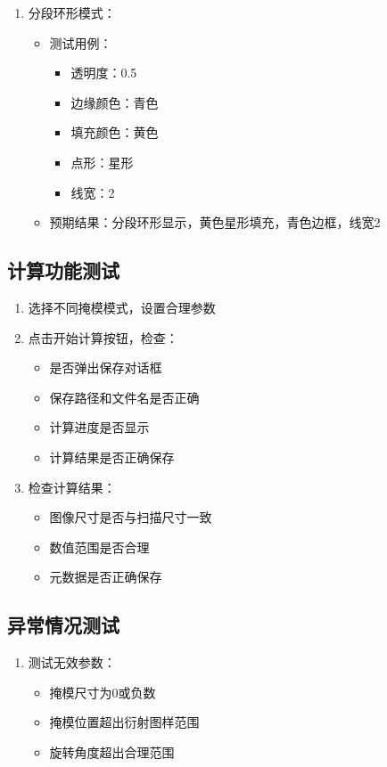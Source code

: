 \documentclass[a4paper,12pt]{report}	%
\begin{document}
\begin{enumerate}
    \item 分段环形模式：
    \begin{itemize}
        \item 测试用例：
        \begin{itemize}
            \item 透明度：0.5
            \item 边缘颜色：青色
            \item 填充颜色：黄色
            \item 点形：星形
            \item 线宽：2
        \end{itemize}
        \item 预期结果：分段环形显示，黄色星形填充，青色边框，线宽2
    \end{itemize}
\end{enumerate}

\subsection{计算功能测试}
\begin{enumerate}
    \item 选择不同掩模模式，设置合理参数
    \item 点击开始计算按钮，检查：
    \begin{itemize}
        \item 是否弹出保存对话框
        \item 保存路径和文件名是否正确
        \item 计算进度是否显示
        \item 计算结果是否正确保存
    \end{itemize}
    \item 检查计算结果：
    \begin{itemize}
        \item 图像尺寸是否与扫描尺寸一致
        \item 数值范围是否合理
        \item 元数据是否正确保存
    \end{itemize}
\end{enumerate}

\subsection{异常情况测试}
\begin{enumerate}
    \item 测试无效参数：
    \begin{itemize}
        \item 掩模尺寸为0或负数
        \item 掩模位置超出衍射图样范围
        \item 旋转角度超出合理范围
    \end{itemize}
\end{enumerate}
\end{document}

